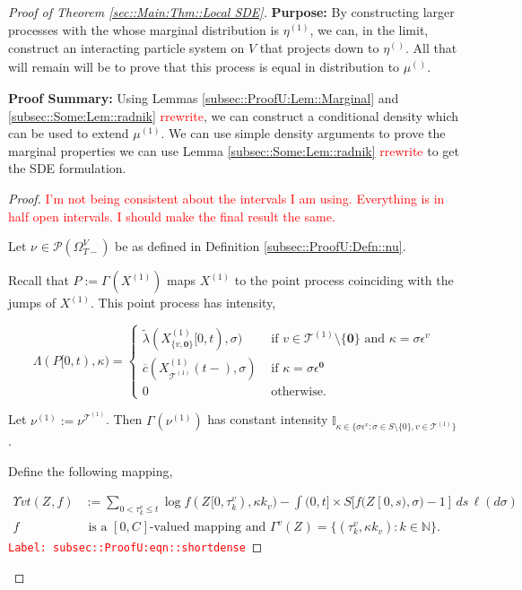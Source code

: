 \documentclass[12pt]{article}
\newcommand{\mb}{\mathbb}
\newcommand{\mc}{\mathcal}
\newcommand{\ov}{\overline}
\newcommand{\te}{\text}
\newcommand{\ep}{\epsilon}
\newcommand{\tr}{\textcolor{red}}
\newcommand{\labe}[1]{\tr{\texttt{Label: #1}}}
\newcommand{\purpose}{\textbf{Purpose: }}
\newcommand{\pfsum}{\textbf{Proof Summary: }}
\newcommand{\ind}{\hspace{24pt}}
\newcommand{\defeq}{:=}								%
\newcommand{\pmsr}{\mc{P}}							%
\renewcommand{\root}{\mathbf{0}}				%
\renewcommand{\v}{v}							%
\renewcommand{\S}{S}							%
\newcommand{\s}{\sigma}							%
\newcommand{\ev}{\ep}							%
\newcommand{\T}{T}								%
\renewcommand{\t}{t}							%
\newcommand{\sset}{\Omega}						%
\renewcommand{\tt}{s}							%
\newcommand{\X}{X}								%
\newcommand{\vind}[1]{^{#1}}					%
\newcommand{\vsi}[1]{^{#1}}						%
\newcommand{\cind}[1]{_{#1}}					%
\newcommand{\tp}[1]{(#1)}						%
\newcommand{\tip}[1]{#1}						%
\newcommand{\ts}[1]{_{#1}}						%
\newcommand{\const}{C}							%
\newcommand{\IGrg}{\ov{c}}						%
\newcommand{\tree}{\mc{T}}						%
\newcommand{\sln}[1]{^{(#1)}}					%
\newcommand{\Sm}{\ell}							%
\newcommand{\alt}[1]{\widetilde{#1}}			%
\newcommand{\indx}[1]{_{#1}}					%
\newcommand{\m}{\mu}							%
\newcommand{\mm}{\nu}							%
\newcommand{\mmm}{\eta}							%
\newcommand{\XXX}{Z}							%
\newcommand{\rt}{\tau}							%
\renewcommand{\it}{k}							%
\newcommand{\pmap}{\Gamma}						%
\renewcommand{\mark}{\kappa}					%
\newcommand{\rp}{P}								%
\newcommand{\ratee}{\Lambda}					%
\newcommand{\crate}{\alt{\lambda}}				%
\newcommand{\ds}{\Upsilon}						%
\begin{document}
\begin{proof}[Proof of Theorem \ref{sec::Main:Thm::Local SDE}]
\purpose By constructing larger processes with the whose marginal distribution is \(\mmm\sln{1}\ts{}\), we can, in the limit, construct an interacting particle system on \(V\) that projects down to \(\mmm\sln{}\ts{}\). All that will remain will be to prove that this process is equal in distribution to \(\m\sln{}\ts{}\).

\pfsum Using Lemmas \ref{subsec::ProofU:Lem::Marginal} and \ref{subsec::Some:Lem::radnik} \tr{rrewrite}, we can construct a conditional density which can be used to extend \(\mu\sln{1}\). We can use simple density arguments to prove the marginal properties we can use Lemma \ref{subsec::Some:Lem::radnik} \tr{rrewrite} to get the SDE formulation.

\begin{proof}
\tr{I'm not being consistent about the intervals I am using. Everything is in half open intervals. I should make the final result the same.}

Let \(\mm\vind{}\ts{} \in \pmsr(\sset\vsi{V}\ts{\T-})\) be as defined in Definition \ref{subsec::ProofU:Defn::nu}.

\ind Recall that \(\rp{} \defeq \pmap\vind{}(\X\sln{1}\cind{}\tip{})\) maps \(\X\sln{1}\cind{}\tip{}\) to the point process coinciding with the jumps of \(\X\sln{1}\cind{}\tip{}\). This point process has intensity,

\[\ratee(\rp{}[0,\t),\mark{}) = \begin{cases}
\crate{}{}(\X\sln{1}\cind{\{\v,\root\}}\tip{[0,\t)},\s) &\te{ if } \v\in \tree\sln{1}\setminus\{\root\}\te{ and } \mark{} = \s\ev\vind{\v}\\
\IGrg{}(\X\sln{1}\cind{\tree\sln{1}}\tp{\t-},\s) &\te{ if } \mark{} = \s\ev\vind{\root}\\
0 &\te{ otherwise}.
\end{cases}\]

Let \(\mm\sln{1}\ts{} \defeq \mm\vind{\tree\sln{1}}\ts{}\). Then \(\pmap\vind{}(\mm\sln{1}\ts{})\) has constant intensity \(\mb{I}_{\kappa \in\{\s\ev\vind{\v}:\s\in\S\setminus\{0\},\v\in\tree\sln{1}\}}\). 

\ind Define the following mapping,

\begin{align}
\ds{\v}{\t}(\XXX\cind{}\tip{},f) &\defeq \sum_{0 < \rt\indx{\it}\vind{\v} \leq \t} \log{f(\XXX\cind{}\tip{[0,\rt\indx{\it}\vind{\v})},\mark{\it}_\v)} - \int{(0,\t]\times \S} [f(\XXX\cind{}\tip{[0,\tt)},\s) - 1]\,ds\,\Sm(d\s) \label{subsec::ProofU:eqn::shortdense}\\
f&\te{ is a }[0,\const\indx{}] \te{-valued mapping and } \pmap\vind{\v}(\XXX\cind{}\tip{}) = \{(\rt\indx{\it}\vind{\v},\mark{\it}_\v):\it\in\mb{N}\}.\nonumber
\end{align} 
\labe{subsec::ProofU:eqn::shortdense}


\end{proof}
\end{proof}
\end{document}
